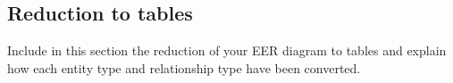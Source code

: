 \documentclass[12pt]{article}
\begin{document}
%
%
%
%
%
%
%

    \subsection{Reduction to tables}
    Include in this section the reduction of your EER diagram to tables and explain how each entity type and relationship type have been converted.
\end{document}

